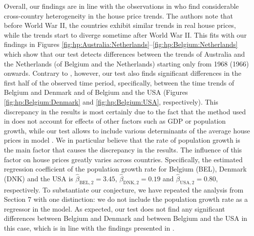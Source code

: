 \documentclass[12pt]{article}
\makeatletter
\renewcommand{\eqref}[1]{\tagform@{\ref{#1}}}
\makeatother
\begin{document}
Overall, our findings are in line with the observations in \cite{Knoll2017} who find considerable cross-country heterogeneity in the house price trends. The authors note that before World War II, the countries exhibit similar trends in real house prices, while the trends start to diverge sometime after World War II. This fits with our findings in Figures \ref{fig:hp:Australia:Netherlands}--\ref{fig:hp:Belgium:Netherlands} which show that our test detects differences between the trends of Australia and the Netherlands (of Belgium and the Netherlands) starting only from 1968 (1966) onwards. Contrary to \cite{Knoll2017}, however, our test also finds significant differences in the first half of the observed time period, specifically, between the time trends of Belgium and Denmark and of Belgium and the USA (Figures \ref{fig:hp:Belgium:Denmark} and \ref{fig:hp:Belgium:USA}, respectively). This discrepancy in the results is most certainly due to the fact that the method used in \cite{Knoll2017} does not account for effects of other factors such as GDP or population growth, while our test allows to include various determinants of the average house prices in model \eqref{eq:model:app4}. We in particular believe that the rate of population growth is the main factor that causes the discrepancy in the results. The influence of this factor on house prices greatly varies across countries. Specifically, the estimated regression coefficient of the population growth rate for Belgium (BEL), Denmark (DNK) and the USA is $\widehat{\beta}_{\text{BEL}, 2} = 3.45$, $\widehat{\beta}_{\text{DNK}, 2} = 0.19$ and $\widehat{\beta}_{\text{USA}, 2} = 0.80$, respectively. To substantiate our conjecture, we have repeated the analysis from Section 7 with one distinction: we do not include the population growth rate as a regressor in the model. As expected, our test does not find any significant differences between Belgium and Denmark and between Belgium and the USA in this case, which is in line with the findings presented in \cite{Knoll2017}. 
\end{document}
